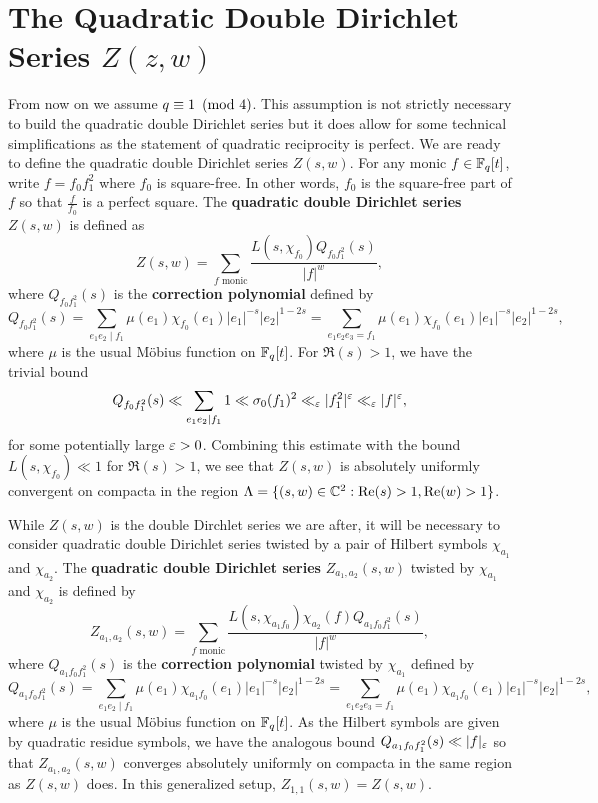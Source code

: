 \documentclass[12pt,reqno,oneside]{amsart}
\begin{document}
\section{The Quadratic Double Dirichlet Series \texorpdfstring{$Z(z,w)$}{Z(s,w)}}
    From now on we assume $q \equiv 1 \ \left(\text{mod }4\right)$. This assumption is not strictly necessary to build the quadratic double Dirichlet series but it does allow for some technical simplifications as the statement of quadratic reciprocity is perfect. We are ready to define the quadratic double Dirichlet series $Z(s,w)$. For any monic $f \in \mathbb{F}_{q}[t]$, write $f = f_{0}f_{1}^{2}$ where $f_{0}$ is square-free. In other words, $f_{0}$ is the square-free part of $f$ so that $\frac{f}{f_{0}}$ is a perfect square. The \textbf{quadratic double Dirichlet series} $Z(s,w)$ is defined as
    \[
        Z(s,w) = \sum_{\text{$f$ monic}}\frac{L(s,\chi_{f_{0}})Q_{f_{0}f_{1}^{2}}(s)}{|f|^{w}},
    \]
    where $Q_{f_{0}f_{1}^{2}}(s)$ is the \textbf{correction polynomial} defined by
    \[
        Q_{f_{0}f_{1}^{2}}(s) = \sum_{e_{1}e_{2} \mid f_{1}}\mu(e_{1})\chi_{f_{0}}(e_{1})|e_{1}|^{-s}|e_{2}|^{1-2s} = \sum_{e_{1}e_{2}e_{3} = f_{1}}\mu(e_{1})\chi_{f_{0}}(e_{1})|e_{1}|^{-s}|e_{2}|^{1-2s},
    \]
    where $\mu$ is the usual M\"obius function on $\mathbb{F}_{q}[t]$. For $\Re(s) > 1$, we have the trivial bound
    \[
        Q_{f_{0}f_{1}^{2}}(s) \ll \sum_{e_{1}e_{2} \mid f_{1}}1 \ll \sigma_{0}(f_{1})^{2} \ll_{\varepsilon} |f_{1}^{2}|^{\varepsilon} \ll_{\varepsilon} |f|^{\varepsilon},
    \]
    for some potentially large $\varepsilon > 0$. Combining this estimate with the bound $L(s,\chi_{f_{0}}) \ll 1$ for $\Re(s) > 1$, we see that $Z(s,w)$ is absolutely uniformly convergent on compacta in the region $\Lambda = \{(s,w) \in \mathbb{C}^{2}:\mathrm{Re}(s) > 1, \mathrm{Re}(w) > 1\}$.

    While $Z(s,w)$ is the double Dirchlet series we are after, it will be necessary to consider quadratic double Dirichlet series twisted by a pair of Hilbert symbols $\chi_{a_{1}}$ and $\chi_{a_{2}}$. The \textbf{quadratic double Dirichlet series} $Z_{a_{1},a_{2}}(s,w)$ twisted by $\chi_{a_{1}}$ and $\chi_{a_{2}}$ is defined by
    \[
        Z_{a_{1},a_{2}}(s,w) = \sum_{\text{$f$ monic}}\frac{L(s,\chi_{a_{1}f_{0}})\chi_{a_{2}}(f)Q_{a_{1}f_{0}f_{1}^{2}}(s)}{|f|^{w}},
    \]
    where $Q_{a_{1}f_{0}f_{1}^{2}}(s)$ is the \textbf{correction polynomial} twisted by $\chi_{a_{1}}$ defined by
    \[
        Q_{a_{1}f_{0}f_{1}^{2}}(s) = \sum_{e_{1}e_{2} \mid f_{1}}\mu(e_{1})\chi_{a_{1}f_{0}}(e_{1})|e_{1}|^{-s}|e_{2}|^{1-2s} = \sum_{e_{1}e_{2}e_{3} = f_{1}}\mu(e_{1})\chi_{a_{1}f_{0}}(e_{1})|e_{1}|^{-s}|e_{2}|^{1-2s},
    \]
    where $\mu$ is the usual M\"obius function on $\mathbb{F}_{q}[t]$. As the Hilbert symbols are given by quadratic residue symbols, we have the analogous bound $Q_{a_{1}f_{0}f_{1}^{2}}(s) \ll |f|_{\varepsilon}$ so that $Z_{a_{1},a_{2}}(s,w)$ converges absolutely uniformly on compacta in the same region as $Z(s,w)$ does. In this generalized setup, $Z_{1,1}(s,w) = Z(s,w)$.
\end{document}
